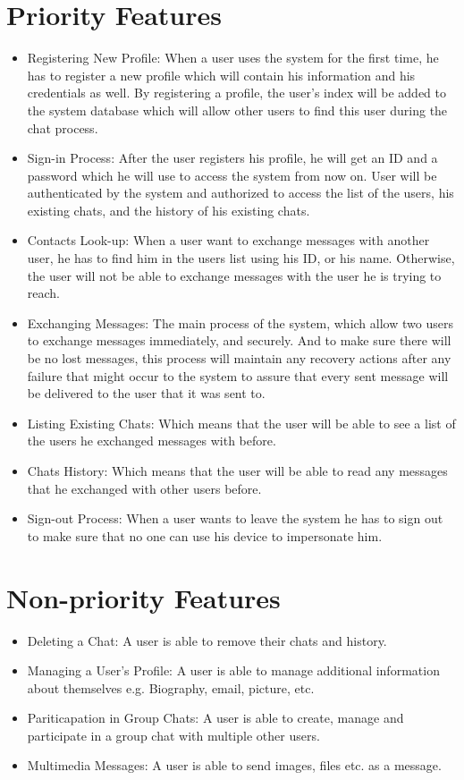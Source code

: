 \documentclass[11pt,a4paper]{report}
\begin{document}
\section{Priority Features}
\begin{itemize}
  \item Registering New Profile: When a user uses the system for the first time, he has to register a new profile which will contain his information and his credentials as well. By registering a profile, the user's index will be added to the system database which will allow other users to find this user during the chat process.
  \item Sign-in Process: After the user registers his profile, he will get an ID and a password which he will use to access the system from now on. User will be authenticated by the system and authorized to access the list of the users, his existing chats, and the history of his existing chats.
  \item Contacts Look-up: When a user want to exchange messages with another user, he has to find him in the users list using his ID, or his name. Otherwise, the user will not be able to exchange messages with the user he is trying to reach.
  \item Exchanging Messages: The main process of the system, which allow two users to exchange messages immediately, and securely. And to make sure there will be no lost messages, this process will maintain any recovery actions after any failure that might occur to the system to assure that every sent message will be delivered to the user that it was sent to.
  \item Listing Existing Chats: Which means that the user will be able to see a list of the users he exchanged messages with before.
  \item Chats History: Which means that the user will be able to read any messages that he exchanged with other users before.
  \item Sign-out Process: When a user wants to leave the system he has to sign out to make sure that no one can use his device to impersonate him.
\end{itemize}

\section{Non-priority Features}
\begin{itemize}
  \item Deleting a Chat: A user is able to remove their chats and history.
  \item Managing a User's Profile: A user is able to manage additional information about themselves e.g. Biography, email, picture, etc.
  \item Pariticapation in Group Chats: A user is able to create, manage and participate in a group chat with multiple other users.
  \item Multimedia Messages: A user is able to send images, files etc. as a message.
\end{itemize}
\end{document}

